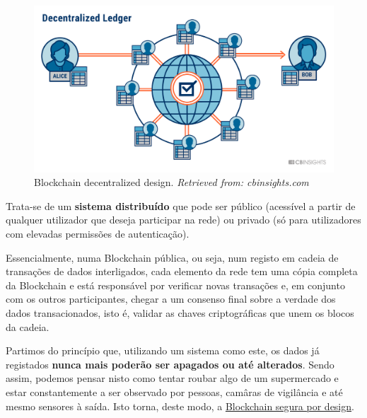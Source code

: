 \documentclass{llncs}
\begin{document}
    \vspace{0.05cm}

    \begin{figure}
    \includegraphics[width=\textwidth]{template_LNCS_Blockchain/img/modelo-descentralizado.png}
    \caption{Blockchain decentralized design. \textit{Retrieved from: cbinsights.com}} \label{fig1}
    \end{figure}
    
    \vspace{8cm}

    \vspace{0.05cm}

	Trata-se de um \textbf{sistema distribuído} que pode ser público (acessível a partir de qualquer utilizador que deseja participar na rede) ou privado (só para utilizadores com elevadas permissões de autenticação).  \par
    
    \vspace{0.05cm}

	Essencialmente, numa Blockchain pública, ou seja, num registo em cadeia de transações de dados interligados, cada elemento da rede tem uma cópia completa da Blockchain e está responsável por verificar novas transações e, em conjunto com os outros participantes, chegar a um consenso final sobre a verdade dos dados transacionados, isto é, validar as chaves criptográficas que unem os blocos da cadeia. \par

    \vspace{0.05cm}

	Partimos do princípio que, utilizando um sistema como este, os dados já registados \textbf{nunca mais poderão ser apagados ou até alterados}. Sendo assim, podemos pensar nisto como tentar roubar algo de um supermercado e estar constantemente a ser observado por pessoas, camâras de vigilância e até mesmo sensores à saída. Isto torna, deste modo, a \underline{Blockchain segura por design}. \par
\end{document}
